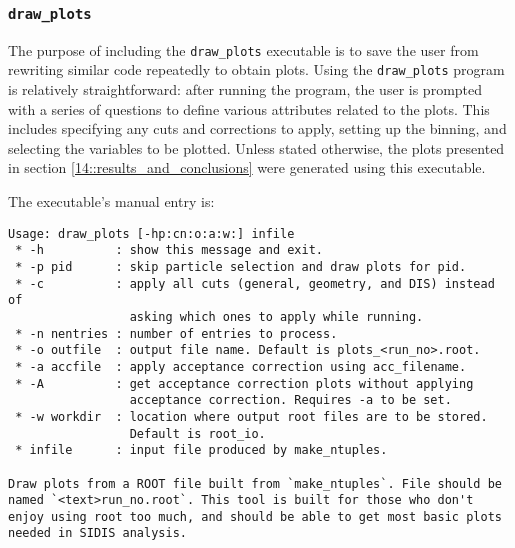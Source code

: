 \subsubsection{\texttt{draw\_plots}}
\label{14.15::draw_plots}
    The purpose of including the \texttt{draw\_plots} executable is to save the user from rewriting similar code repeatedly to obtain plots.
    Using the \texttt{draw\_plots} program is relatively straightforward: after running the program, the user is prompted with a series of questions to define various attributes related to the plots.
    This includes specifying any cuts and corrections to apply, setting up the binning, and selecting the variables to be plotted.
    Unless stated otherwise, the plots presented in section \ref{14::results_and_conclusions} were generated using this executable.

    The executable's manual entry is:
    \begin{lstlisting}
Usage: draw_plots [-hp:cn:o:a:w:] infile
 * -h          : show this message and exit.
 * -p pid      : skip particle selection and draw plots for pid.
 * -c          : apply all cuts (general, geometry, and DIS) instead of
                 asking which ones to apply while running.
 * -n nentries : number of entries to process.
 * -o outfile  : output file name. Default is plots_<run_no>.root.
 * -a accfile  : apply acceptance correction using acc_filename.
 * -A          : get acceptance correction plots without applying
                 acceptance correction. Requires -a to be set.
 * -w workdir  : location where output root files are to be stored.
                 Default is root_io.
 * infile      : input file produced by make_ntuples.

Draw plots from a ROOT file built from `make_ntuples`. File should be named `<text>run_no.root`. This tool is built for those who don't enjoy using root too much, and should be able to get most basic plots needed in SIDIS analysis.
    \end{lstlisting}
